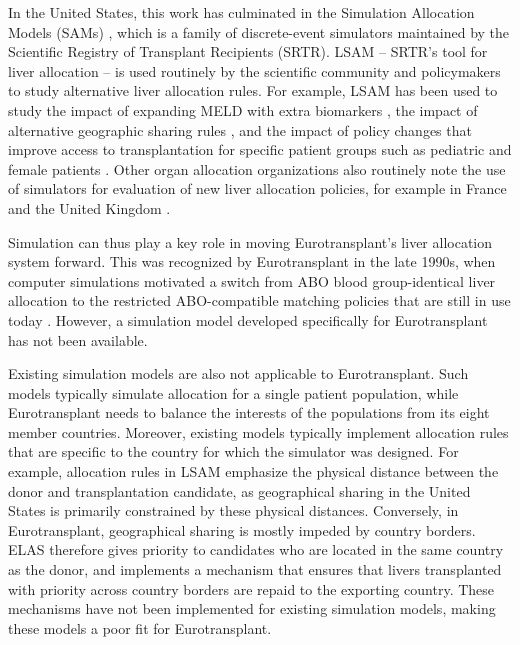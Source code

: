 \documentclass[11pt,twoside,]{book}
\begin{document}
In the United States, this work has culminated in the Simulation Allocation Models (SAMs)
\citep{ThompsonXSAM2004}, which is a family of discrete-event simulators
maintained by the Scientific Registry of Transplant Recipients (SRTR).
LSAM -- SRTR's tool for liver allocation \citep{ThompsonXSAM2004} --
is used routinely by the scientific community and
policymakers to study alternative liver allocation rules. For example,
LSAM has been used to study the impact of expanding MELD with extra
biomarkers \citep{kimHyponatremiaMortalityPatients2008a, kimMELD3point0},
the impact of alternative geographic sharing rules
\citep{freemanImprovingLiverAllocation2004, axelrodEconomicImplicationsBroader2011, gentryAddressingGeographicDisparities2013, goelLiverSimulatedAllocation2018, akshatHeterogeneousDonorCircles2024},
and the impact of policy changes that improve access to transplantation for
specific patient groups such as pediatric and female patients
\citep{peritoImpactIncreasedAllocation2019, heimbachDelayedHepatocellularCarcinoma2015, bernardsAwardingAdditionalMELD2022}. Other organ allocation organizations also
routinely note the use of simulators for evaluation of new liver allocation
policies, for example in France \citep{bayer2021removing} and the United
Kingdom \citep{Allen2024}.

Simulation can thus play a key role in moving Eurotransplant's liver
allocation system forward. This was recognized by Eurotransplant in the late
1990s, when computer simulations motivated a switch from ABO blood
group-identical liver allocation to the restricted ABO-compatible matching policies
that are still in use today \citep{demeesterWhichABOmatchingRule2002}. However, a simulation
model developed specifically for Eurotransplant has not been available.

Existing simulation models are also not applicable to Eurotransplant. Such models
typically simulate allocation for a single patient population, while Eurotransplant needs
to balance the interests of the populations from its eight member
countries. Moreover, existing models typically implement allocation
rules that are specific to the country for which the simulator was
designed. For example, allocation rules in LSAM emphasize the physical distance between the donor and transplantation
candidate, as geographical sharing in the United States is
primarily constrained by these physical distances. Conversely, in Eurotransplant,
geographical sharing is mostly impeded by country borders.
ELAS therefore gives priority to candidates who are located in the
same country as the donor, and implements a mechanism that
ensures that livers transplanted with priority across country borders are repaid
to the exporting country. These mechanisms have not been implemented for
existing simulation models, making these models a poor fit for Eurotransplant.
\end{document}
